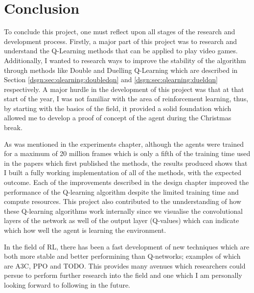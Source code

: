 \chapter{Conclusion}

To conclude this project, one must reflect upon all stages of the research and development process. Firstly, a major part of this project was to research and understand the Q-Learning methods that can be applied to play video games. Additionally, I wanted to research ways to improve the stability of the algorithm through methods like Double and Duelling Q-Learning which are described in Section \ref{dsgn:sec:qlearning:doubledqn} and \ref{dsgn:sec:qlearning:dueldqn} respectively. A major hurdle in the development of this project was that at that start of the year, I was not familiar with the area of reinforcement learning, thus, by starting with the basics of the field, it provided a solid foundation which allowed me to develop a proof of concept of the agent during the Christmas break.

As was mentioned in the experiments chapter, although the agents were trained for a maximum of 20 million frames which is only a fifth of the training time used in the papers which first published the methods, the results produced shows that I built a fully working implementation of all of the methods, with the expected outcome. Each of the improvements described in the design chapter improved the performance of the Q-learning algorithm despite the limited training time and compute resources. This project also contributed to the unnderstanding of how these Q-learning algorithms work internally since we visualise the convolutional layers of the network as well of the output layer (Q-values) which can indicate which how well the agent is learning the environment.

In the field of RL, there has been a fast development of new techniques which are both more stable and better performining than Q-networks; examples of which are A3C, PPO and TODO. This provides many avenues which researchers could persue to perform further research into the field and one which I am personally looking forward to following in the future.